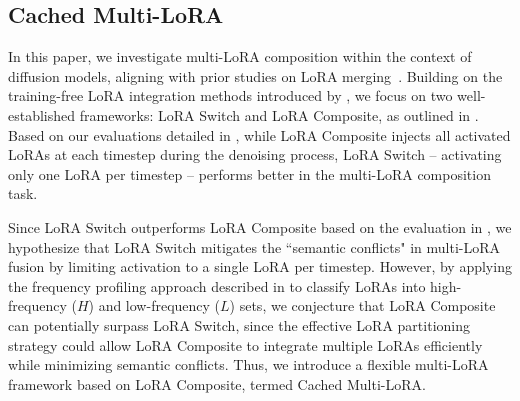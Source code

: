 \subsection{Cached Multi-LoRA}
\vspace{-5pt}
In this paper, we investigate multi-LoRA composition within the context of diffusion models, aligning with prior studies on LoRA merging~\citep{mixlora, multilora}. Building on the training-free LoRA integration methods introduced by \citet{multilora}, we focus on two well-established frameworks: LoRA Switch and LoRA Composite, as outlined in . Based on our evaluations detailed in , while LoRA Composite injects all activated LoRAs at each timestep during the denoising process, LoRA Switch -- activating only one LoRA per timestep -- performs better in the multi-LoRA composition task. 

Since LoRA Switch outperforms LoRA Composite based on the evaluation in , we hypothesize that LoRA Switch mitigates the ``semantic conflicts" in multi-LoRA fusion by limiting activation to a single LoRA per timestep. However, by applying the frequency profiling approach described in  to classify LoRAs into high-frequency ($H$) and low-frequency ($L$) sets, we conjecture that LoRA Composite can potentially surpass LoRA Switch, since the effective LoRA partitioning strategy could allow LoRA Composite to integrate multiple LoRAs efficiently while minimizing semantic conflicts. Thus, we introduce a flexible multi-LoRA framework based on LoRA Composite, termed Cached Multi-LoRA.
\vspace{-4pt}
